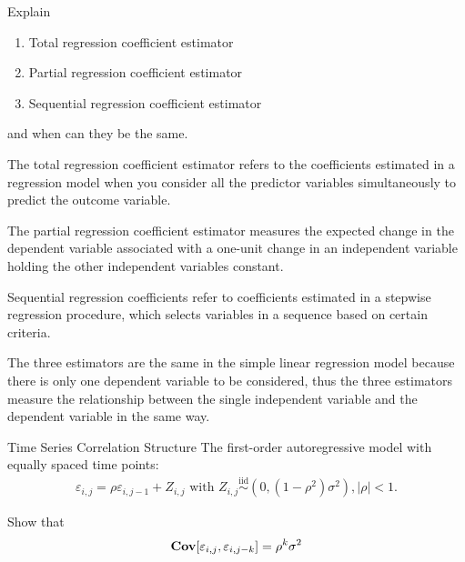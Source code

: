 \documentclass[UTF8,a4paper,10pt]{article}
\begin{document}
  \begin{Problem}[]{}
    Explain
    \begin{enumerate}
      \item Total regression coefficient estimator
      \item Partial regression coefficient estimator
      \item Sequential regression coefficient estimator
    \end{enumerate}
    and when can they be the same.
  \end{Problem} 

  \begin{solution}

    The total regression coefficient estimator refers to the coefficients estimated in a regression model when you consider all the predictor variables simultaneously to predict the outcome variable.

    The partial regression coefficient estimator measures the expected change in the dependent variable associated with a one-unit change in an independent variable holding the other independent variables constant.
    
    Sequential regression coefficients refer to coefficients estimated in a stepwise regression procedure, which selects variables in a sequence based on certain criteria.

    The three estimators are the same in the simple linear regression model because there is only one dependent variable to be considered, thus the three estimators measure the relationship between the single independent variable and the dependent variable in the same way.
    
  \end{solution}

  \begin{Problem}[]{Time Series Correlation Structure}
The first-order autoregressive model with equally spaced time points:
\begin{equation*}
  \begin{aligned}
    \varepsilon_{i,j} = \rho\varepsilon_{i,j-1}+Z_{i,j}\text{ with }Z_{i,j}\overset{\text{iid}}{\sim } (0,(1-\rho^2)\sigma^2),|\rho|<1.
  \end{aligned}
\end{equation*}

Show that 
\begin{equation*}
  \begin{aligned}
    \operatorname{\textbf{Cov}}[\varepsilon_{i,j},\varepsilon_{i,j-k}] = \rho^k\sigma^2
  \end{aligned}
\end{equation*}

  \end{Problem} 
\end{document}

